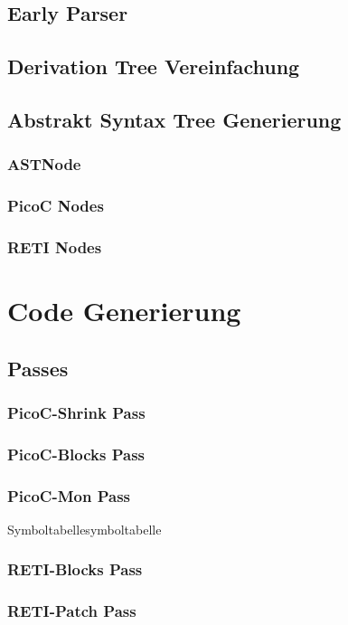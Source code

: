 \subsection{Early Parser}
\subsection{Derivation Tree Vereinfachung}
\subsection{Abstrakt Syntax Tree Generierung}
\subsubsection{ASTNode}
\subsubsection{PicoC Nodes}
\subsubsection{RETI Nodes}
\section{Code Generierung}
\subsection{Passes}
\subsubsection{PicoC-Shrink Pass}
\subsubsection{PicoC-Blocks Pass}
\subsubsection{PicoC-Mon Pass}
\begin{Definition}{Symboltabelle}{symboltabelle}
\end{Definition}
\subsubsection{RETI-Blocks Pass}
\subsubsection{RETI-Patch Pass}
